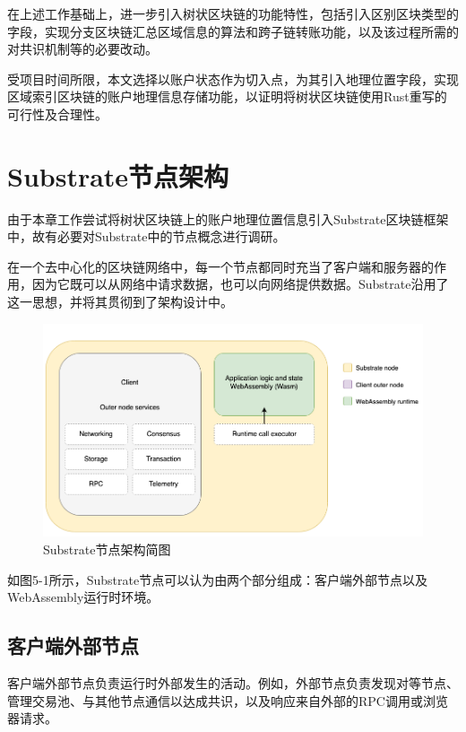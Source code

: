 在上述工作基础上，进一步引入树状区块链的功能特性，包括引入区别区块类型的字段，实现分支区块链汇总区域信息的算法和跨子链转账功能，以及该过程所需的对共识机制等的必要改动。

受项目时间所限，本文选择以账户状态作为切入点，为其引入地理位置字段，实现区域索引区块链的账户地理信息存储功能，以证明将树状区块链使用Rust重写的可行性及合理性。

\section{Substrate节点架构}

由于本章工作尝试将树状区块链上的账户地理位置信息引入Substrate区块链框架中，故有必要对Substrate中的节点概念进行调研。

在一个去中心化的区块链网络中，每一个节点都同时充当了客户端和服务器的作用，因为它既可以从网络中请求数据，也可以向网络提供数据。Substrate沿用了这一思想，并将其贯彻到了架构设计中。

\begin{figure}[htbp]
    \centering
    \includegraphics[width=\textwidth]{images/simplified-architecture.png}
    \caption{Substrate节点架构简图}\label{Substrate节点架构简图} %
\end{figure}

如图5-1所示，Substrate节点可以认为由两个部分组成：客户端外部节点以及WebAssembly运行时环境。

\subsection{客户端外部节点}

客户端外部节点负责运行时外部发生的活动。例如，外部节点负责发现对等节点、管理交易池、与其他节点通信以达成共识，以及响应来自外部的RPC调用或浏览器请求。

